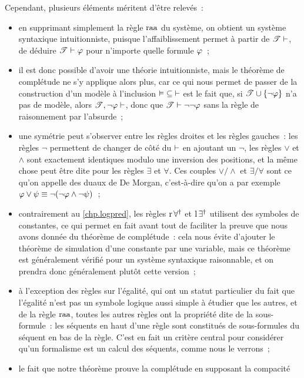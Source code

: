 Cependant, plusieurs éléments méritent d'être relevés~:
\begin{itemize}
\item en supprimant simplement la règle $\operatorname{raa}$ du système, on obtient un
  système syntaxique intuitionniste, puisque l'affaiblissement permet à partir
  de $\mathscr T \vdash$, de déduire $\mathscr T \vdash \varphi$ pour n'importe
  quelle formule $\varphi$~;
\item il est donc possible d'avoir une théorie intuitionniste, mais le théorème
  de complétude ne s'y applique alors plus, car ce qui nous permet de passer de
  la construction d'un modèle à l'inclusion
  $\mathord{\vDash}\subseteq\mathord{\vdash}$
  est le fait que, si $\mathscr T \cup\{\lnot\varphi\}$ n'a pas de modèle, alors
  $\mathscr T, \lnot\varphi\vdash$, donc que $\mathscr T \vdash \lnot\lnot\varphi$ sans la règle
  de raisonnement par l'absurde~;
\item une symétrie peut s'observer entre les règles droites et les règles
  gauches~: les règles $\lnot$ permettent de changer de côté du $\vdash$ en
  ajoutant un $\lnot$, les règles $\lor$ et $\land$ sont exactement identiques
  modulo une inversion des positions, et la même chose peut être dite pour les
  règles $\exists$ et $\forall$. Ces couples $\lor/\land$ et $\exists/\forall$
  sont ce qu'on appelle des duaux de De Morgan, c'est-à-dire qu'on a par exemple
  $\varphi \lor \psi \equiv \lnot (\lnot \varphi \land \lnot \psi)$~;
\item contrairement au \cref{chp.logpred}, les règles $\operatorname{r}\mathord{\forall}^\dagger$ et
  $\operatorname{l}\mathord{\exists}^\dagger$ utilisent des symboles de constantes, ce qui permet en
  fait avant tout de faciliter la preuve que nous avons donnée du théorème de
  complétude~: cela nous évite d'ajouter le théorème de simulation d'une
  constante par une variable, mais ce théorème est généralement vérifié pour
  un système syntaxique raisonnable, et on prendra donc généralement plutôt
  cette version~;
\item à l'exception des règles sur l'égalité, qui ont un statut particulier du
  fait que l'égalité n'est pas un symbole logique aussi simple à étudier que les
  autres, et de la règle $\operatorname{raa}$, toutes les autres règles ont la propriété dite
  de la sous-formule~: les séquents en haut d'une règle sont constitués de
  sous-formules du séquent en bas de la règle. C'est en fait un critère central
  pour considérer qu'un formalisme est un calcul des séquents, comme nous le
  verrons~;
\item le fait que notre théorème prouve la complétude en supposant la compacité

\end{itemize}
